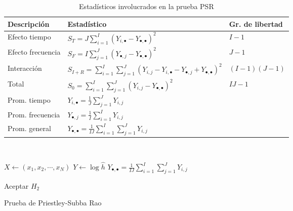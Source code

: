 \documentclass[12pt,letterpaper,draft]{book}
\newcommand{\abso}[1]{\left| #1 \right|}
\newcommand{\bordes}[1]{\renewcommand{\arraystretch}{#1}}
\newcommand{\midrulec}{%
  \arrayrulecolor{gris}\specialrule{\aboverulesep}{0pt}{0pt}
  \arrayrulecolor{black}\specialrule{\lightrulewidth}{0pt}{\belowrulesep}
}
\begin{document}
\begin{table}
\caption{Estadísticos involucrados en la prueba PSR}
\centering
\bordes{1.1}
\begin{tabular}{lll}
\toprule
Descripción & Estadístico & {Gr. de libertad} \\
\midrule
Efecto tiempo &
$S_T =J \sum_{i=1}^{I} \left( Y_{i,\bullet} - Y_{\bullet,\bullet} \right)^{2}$ 
& $I-1$ \\
Efecto frecuencia &
$S_F = I \sum_{j=1}^{J} \left( Y_{\bullet,j} - Y_{\bullet,\bullet} \right)^{2}$ 
& $J-1$ \\
Interacción &
$S_{I+R} = \sum_{i=1}^{I} \sum_{j=1}^{J} 
\left( Y_{i,j} - Y_{i,\bullet} - Y_{\bullet,j} + Y_{\bullet,\bullet} \right)^{2}$ 
& $(I-1)(J-1)$ \\
\rowcolor{gris}
Total &
$S_{0} = \sum_{i=1}^{I} \sum_{j=1}^{J} 
\left( Y_{i,j} - Y_{\bullet,\bullet} \right)^{2}$ 
& $IJ -1$ \\
\midrulec
Prom. tiempo &
$Y_{i,\bullet} = \frac{1}{J} \sum_{j=1}^{J} Y_{i,j}$ & \\
Prom. frecuencia &
$Y_{\bullet,j} = \frac{1}{I} \sum_{i=1}^{I} Y_{i,j}$ & \\
Prom. general &
$Y_{\bullet,\bullet} = \frac{1}{I J} \sum_{i=1}^{I} \sum_{j=1}^{J} Y_{i,j}$ & \\
\bottomrule
\end{tabular} \\
\label{cantidades_psr}
\end{table}

\begin{algorithm}
\DontPrintSemicolon
{}

$ X \leftarrow \left(x_1, x_2, \cdots, x_N \right)$\;
\For{$i = 1, \cdots$; $j=1, \cdots $}{
    $ \widehat{h}[i,j] \leftarrow \sum_{u = t-T}^{T} w_\tau (u) \abso{U[i-u,j]}^{2}$ \;
}
$Y \leftarrow \log{\widehat{h}}$\;
$Y_{\bullet,\bullet} = \frac{1}{I J} \sum_{i=1}^{I} \sum_{j=1}^{J} Y_{i,j}$ \;

Aceptar $H_2$ \;

\caption{Prueba de Priestley-Subba Rao}
\label{algoritmo_stationarity}
\end{algorithm}
\end{document}
